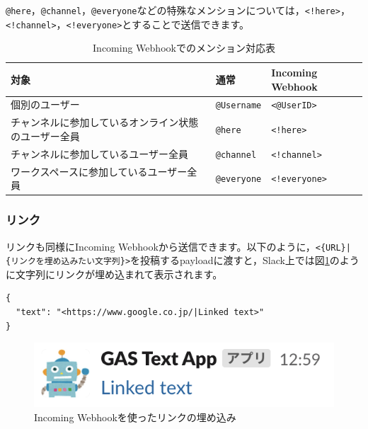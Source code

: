 \documentclass[uplatex,a4j]{jsarticle}
\begin{document}
\verb|@here|，\verb|@channel|，\verb|@everyone|などの特殊なメンションについては，\verb|<!here>|，\verb|<!channel>|，\verb|<!everyone>|とすることで送信できます。

\begin{table}[H]
  \caption{Incoming Webhookでのメンション対応表}
  \centering
  \begin{tabular}{l|ll}
対象 & 通常 & Incoming Webhook \\ \hline
個別のユーザー & \verb|@Username| & \verb|<@UserID>| \\
チャンネルに参加しているオンライン状態のユーザー全員 & \verb|@here| & \verb|<!here>| \\
チャンネルに参加しているユーザー全員 & \verb|@channel| & \verb|<!channel>| \\
ワークスペースに参加しているユーザー全員\footnotemark & \verb|@everyone| & \verb|<!everyone>| \\
  \end{tabular}
\end{table}

\subsubsection{リンク}


リンクも同様にIncoming Webhookから送信できます。以下のように，\verb+<{URL}|{リンクを埋め込みたい文字列}>+を投稿するpayloadに渡すと，Slack上では図\ref{fig:linked_text_sample}のように文字列にリンクが埋め込まれて表示されます。

\begin{lstlisting}[basicstyle=\ttfamily\footnotesize,frame=single,caption=Link payload sample,label=linkpayload]
{
  "text": "<https://www.google.co.jp/|Linked text>"
}
\end{lstlisting}

\begin{figure}[H]
 \centering
 \includegraphics[keepaspectratio, scale=0.8]{images/linked_text_sample.png}
 \caption{Incoming Webhookを使ったリンクの埋め込み}
 \label{fig:linked_text_sample}
\end{figure}
\end{document}
